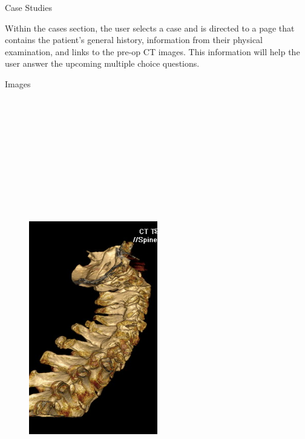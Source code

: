 \documentclass[final]{beamer}
\newlength{\onecolwid}
\begin{document}
\begin{frame}[t]
\begin{columns}[t]
\begin{column}{\onecolwid}
\begin{block}{\LARGE Case Studies}
\begin{figure}
\end{figure}
\large
Within the cases section, the user selects a case and is directed to a page that contains the patient's general history, information from their physical examination, and links to the pre-op CT images. This information will help the user answer the upcoming multiple choice questions. 
\end{block}


\begin{block}{\LARGE Images}

\begin{figure}
\centering
\includegraphics[width=0.5\textwidth, height=20cm]{ct-spine.png}

\end{figure}
\end{block}
\end{column}
\end{columns}
\end{frame}
\end{document}
